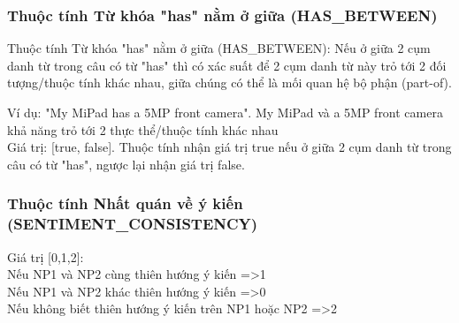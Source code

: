 \documentclass[12pt]{extarticle}
\begin{document}
			\subsubsection*{Thuộc tính Từ khóa "has" nằm ở giữa (HAS\_BETWEEN)}
				\par Thuộc tính Từ khóa "has" nằm ở giữa (HAS\_BETWEEN): Nếu ở giữa 2 cụm danh từ trong câu có từ "has" thì có xác suất để 2 cụm danh từ này trỏ tới 2 đối tượng/thuộc tính khác nhau, giữa chúng có thể là mối quan hệ bộ phận (part-of). 
				\par Ví dụ:
				"My MiPad has a 5MP front camera". My MiPad và a 5MP front camera khả năng trỏ tới 2 thực thể/thuộc tính khác nhau
				\\Giá trị: [true, false]. Thuộc tính nhận giá trị true nếu ở giữa 2 cụm danh từ trong câu có từ "has", ngược lại nhận giá trị false.

			\subsubsection*{Thuộc tính Nhất quán về ý kiến (SENTIMENT\_CONSISTENCY)}
				\par Giá trị [0,1,2]:
				\\Nếu NP1 và NP2 cùng thiên hướng ý kiến =>1
				\\Nếu NP1 và NP2 khác thiên hướng ý kiến =>0
				\\Nếu không biết thiên hướng ý kiến trên NP1 hoặc NP2 =>2
\end{document}
